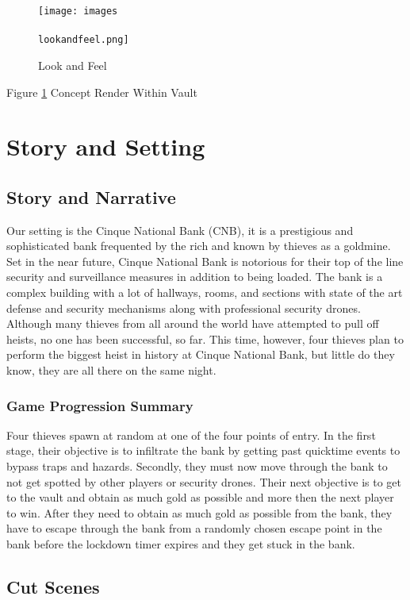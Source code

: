 \documentclass[14pt]{report}
\begin{document}
\begin{figure}
	\texttt{[image: images\\\\lookandfeel.png]}
	\caption{Look and Feel}
	\label{fig:lookandfeel}
\end{figure}

Figure \ref{fig:lookandfeel} Concept Render Within Vault

\chapter{Story and Setting}

\section{Story and Narrative}

Our setting is the Cinque National Bank (CNB), it is a prestigious and sophisticated bank frequented by the rich and known by thieves as a goldmine. Set in the near future, Cinque National Bank is notorious for their top of the line security and surveillance measures in addition to being loaded.  The bank is a complex building with a lot of hallways, rooms, and sections with state of the art defense and security mechanisms along with professional security drones. Although many thieves from all around the world have attempted to pull off heists, no one has been successful, so far. This time, however, four thieves plan to perform the biggest heist in history at Cinque National Bank, but little do they know, they are all there on the same night.

\subsection{Game Progression Summary}

Four thieves spawn at random at one of the four points of entry. In the first stage, their objective is to infiltrate the bank by getting past quicktime events to bypass traps and hazards. Secondly, they must now move through the bank to not get spotted by other players or security drones. 
Their next objective is to get to the vault and obtain as much gold as possible and more then the next player to win. After they need to obtain as much gold as possible from the bank, they have to escape through the bank from a randomly chosen escape point in the bank before the lockdown timer expires and they get stuck in the bank.

\section{Cut Scenes}
\end{document}
